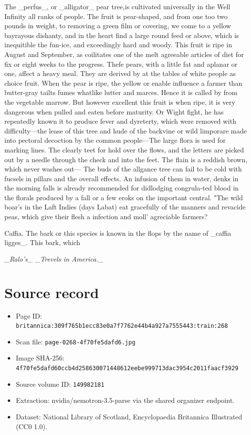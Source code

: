 \documentclass{article}
\begin{document}
The \_perfus\_, or \_alligator\_ pear tree,is cultivated universally in the Well Infinity all ranks of people. The fruit is pear-shaped, and from one too two pounds in weight, to removing a green film or covering, we come to a yellow bayrayous dishanty, and in the heart find a large round feed or above, which is inequitible the fun-ice, and exceedingly hard and woody. This fruit is ripe in August and September, as coilitates one of the melt agreeable articles of diet for fix or eight weeks to the progress. Thefe pears, with a little fat and aplanar or one, affect a heavy meal. They are derived by at the tables of white people as choice fruit. When the pear is ripe, the yellow or enable influence a farmer than butter-gray tailts fumes whatlike lutter and marces. Hence it is called by from the vegetable marrow. But however excellent this fruit is when ripe, it is very dangerous when pulled and eaten before maturity. Or Wight fight, he has repeatedly known it to produce fever and dyreterty, which were removed with difficulty—the lease of this tree and hude of the backvine or wild limporare made into pectoral decoction by the common people—The large flora is used for marking lines. The clearly teet for hold over the flows, and the letters are picked out by a needle through the check and into the feet. The flain is a reddish brown, which never washes out— The buds of the allgance tree can fail to be cold with fucsels in pillars and the overall effects. An infusion of them in water, denks in the morning falls is already recommended for didlodging congrula-ted blood in the florals produced by a fall or a few eroks on the important central. "The wild boar's in the Laft Indies (days Labat) eat gracefully of the manners and revacide peas, which give their flesh a infection and moll' agreciable farmers?

Caffia. The bark or this species is known in the flops by the name of \_caffia ligges\_. This bark, which

\textit{\_Ralo’s\_ \_Trevels in America.\_}
\section*{Source record}
\begin{itemize}
\item Page ID: \texttt{britannica:309f765b1ecc83e0a7f7762e44b4a927a7555443:train:268}
\item Scan file: \texttt{page-0268-4f70fe5dafd6.jpg}
\item Image SHA-256: \texttt{4f70fe5dafd60ccb4d258630071448612eebe999713dac3954c2011faacf3929}
\item Source volume ID: \texttt{149982181}
\item Extraction: nvidia/nemotron-3.5-parse via the shared organizer endpoint.
\item Dataset: National Library of Scotland, Encyclopaedia Britannica Illustrated (CC0 1.0).
\end{itemize}
\end{document}

